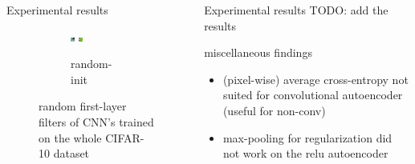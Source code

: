 \documentclass[final]{beamer}
\newlength{\onecolwid}
\newlength{\threecolwid}
\begin{document}
\begin{frame}[t]
\begin{columns}[t]
\begin{column}{\threecolwid}
\begin{columns}[t, totalwidth=\threecolwid]
\begin{column}{\onecolwid}
\begin{block}{Experimental results}
\begin{figure}
\begin{subfigure}{.4\linewidth}
\includegraphics[width=0.1\linewidth]{graphics/cifar_filters/random_08.png}\hspace{0.05\linewidth}
\includegraphics[width=0.1\linewidth]{graphics/cifar_filters/random_09.png}
\caption{random-init}
\end{subfigure}

\caption{random first-layer filters of CNN's trained on the whole CIFAR-10 dataset}

\end{figure}

\end{block}
\end{column}

\begin{column}{\onecolwid}
\begin{block}{Experimental results}
TODO: add the results
\end{block}




\begin{alertblock}{miscellaneous findings}
\begin{itemize}
	\item (pixel-wise) average cross-entropy not suited for convolutional autoencoder (useful for non-conv)
	\item max-pooling for regularization did not work on the relu autoencoder
\end{itemize}
\end{alertblock}
\end{column}
\end{columns}

\end{column}

\end{columns} %

\end{frame} %
\end{document}
